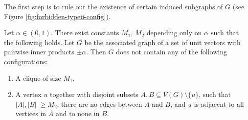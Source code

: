 The first step is to rule out the existence of certain induced subgraphs of $G$ (see Figure \ref{fig:forbidden-typeii-config}).

\begin{lemma} \label{lem:forbidden-induced-subgraphs}
    Let $\alpha \in (0, 1)$.
    There exist constants $M_1$, $M_2$ depending only on $\alpha$ such that the following holds.
    Let $G$ be the associated graph of a set of unit vectors with pairwise inner products $\pm \alpha$.
    Then $G$ does not contain any of the following configurations:
    \begin{enumerate}
        \item A clique of size $M_1$.
        \item A vertex $u$ together with disjoint subsets $A, B \subseteq V(G) \setminus \{ u \}$, such that $|A|, |B|\; \ge M_2$, there are no edges between $A$ and $B$, and $u$ is adjacent to all vertices in $A$ and to none in $B$.
    \end{enumerate}
\end{lemma}

